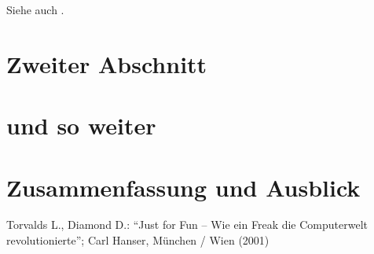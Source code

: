 \documentclass[10pt,a4paper]{article}
\begin{document}
Siehe auch \cite{wp:just_for_fun}.
\section{Zweiter Abschnitt}

\section{und so weiter}

\section{Zusammenfassung und Ausblick}

\begin{thebibliography}{10}
 Torvalds L., Diamond D.:
"`Just for Fun -- Wie ein Freak die Computerwelt revolutionierte"';
Carl Hanser, München / Wien (2001)
\end{thebibliography}
\end{document}
